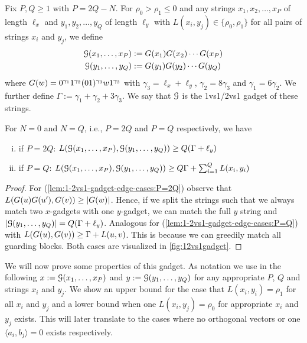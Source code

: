 \begin{definition}
Fix $P, Q \geq 1$ with $P = 2Q - N$.
For $\rho_0 > \rho_1 \leq 0$ and any strings $x_1, x_2, \ldots, x_P$ of length $\ell_x$ and $y_1, y_2, \ldots, y_Q$ of length $\ell_y$ with $L(x_i, y_j) \in \{\rho_0, \rho_1\}$ for all pairs of strings $x_i$ and $y_j$, we define
\begin{align*}
	\mathcal{G}(x_1, \ldots, x_P) &:= G(x_1)G(x_2) \cdots G(x_P)\\
	\mathcal{G}(y_1, \ldots, y_Q) &:= G(y_1)G(y_2) \cdots G(y_Q)
\end{align*}
where $G(w) = 0^{\gamma_1}1^{\gamma_2}(01)^{\gamma_3}w1^{\gamma_3}$ with $\gamma_3 = \ell_x + \ell_y$, $\gamma_2 = 8\gamma_3$ and $\gamma_1 = 6\gamma_2$.
We further define $\Gamma := \gamma_1 + \gamma_2 + 3\gamma_3$.
We say that $\mathcal{G}$ is the 1vs1/2vs1 gadget of these strings.
\end{definition}


\begin{lemma}
\label{lem:1-2vs1-gadget-edge-cases}
For $N = 0$ and $N = Q$, i.e., $P = 2Q$ and $P = Q$ respectively, we have
\begin{enumerate}[(i)]
\item\label{lem:1-2vs1-gadget-edge-cases:P=2Q} if $P = 2Q$: $L(\mathcal{G}(x_1, \ldots, x_P), \mathcal{G}(y_1, \ldots, y_Q)) \geq Q(\Gamma + \ell_y)$
\item\label{lem:1-2vs1-gadget-edge-cases:P=Q} if $P = Q$: $L(\mathcal{G}(x_1, \ldots, x_P), \mathcal{G}(y_1, \ldots, y_Q)) \geq Q\Gamma + \sum_{i = 1}^{Q} L(x_i, y_i)$
\end{enumerate}
\end{lemma}
\begin{proof}
For (\ref{lem:1-2vs1-gadget-edge-cases:P=2Q}) observe that $L(G(u)G(u'), G(v)) \geq |G(w)|$.
Hence, if we split the strings such that we always match two $x$-gadgets with one $y$-gadget, we can match the full $y$ string and $|\mathcal{G}(y_1, \ldots, y_Q)| = Q(\Gamma + \ell_y)$.
Analogous for (\ref{lem:1-2vs1-gadget-edge-cases:P=Q}) with $L(G(u), G(v)) \geq \Gamma + L(u,v)$.
This is because we can greedily match all guarding blocks.
Both cases are visualized in \autoref{fig:12vs1gadget}.
\end{proof}


We will now prove some properties of this gadget.
As notation we use in the following $x := \mathcal{G}(x_1, \ldots, x_P)$ and $y := \mathcal{G}(y_1, \ldots, y_Q)$ for any appropriate $P$, $Q$ and strings $x_i$ and $y_j$.
We show an upper bound for the case that $L(x_i, y_i) = \rho_1$ for all $x_i$ and $y_j$ and a lower bound when one $L(x_i, y_j) = \rho_0$ for appropriate $x_i$ and $y_j$ exists.
This will later translate to the cases where no orthogonal vectors or one $\langle a_i, b_j \rangle = 0$ exists respectively.

